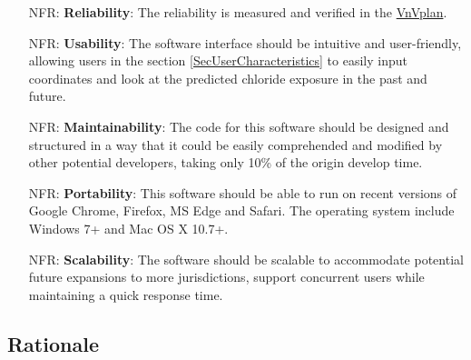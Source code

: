 \documentclass[12pt]{article}
\newcounter{nfrnum} %
\begin{document}
\noindent \begin{itemize}

\item[NFR\refstepcounter{nfrnum}\thenfrnum \label{NFR_Reliability}:]   \textbf{Reliability}: The reliability is measured and verified in the \href{https://github.com/CynthiaLiu0805/BridgeCorrosion/blob/main/docs/VnVPlan/VnVPlan.pdf}{VnVplan}.

\item[NFR\refstepcounter{nfrnum}\thenfrnum \label{NFR_Usability}:] \textbf{Usability}: The software interface should be intuitive and user-friendly, allowing users in the section \ref{SecUserCharacteristics} to easily input coordinates and look at the predicted chloride exposure in the past and future.

\item[NFR\refstepcounter{nfrnum}\thenfrnum \label{NFR_Maintainability}:] \textbf{Maintainability}: The code for this software should be designed and structured in a way that it could be easily comprehended and modified by other potential developers, taking only 10\% of the origin develop time.

\item[NFR\refstepcounter{nfrnum}\thenfrnum \label{NFR_Portability}:]  \textbf{Portability}: This software should be able to run on recent versions of Google Chrome, Firefox, MS Edge and Safari. The operating system include Windows 7+ and Mac OS X 10.7+.

\item[NFR\refstepcounter{nfrnum}\thenfrnum \label{NFR_Scalability}:]   \textbf{Scalability}: The software should be scalable to accommodate potential future expansions to more jurisdictions, support concurrent users while maintaining a quick response time.
\end{itemize}

\subsection{Rationale}
\end{document}
